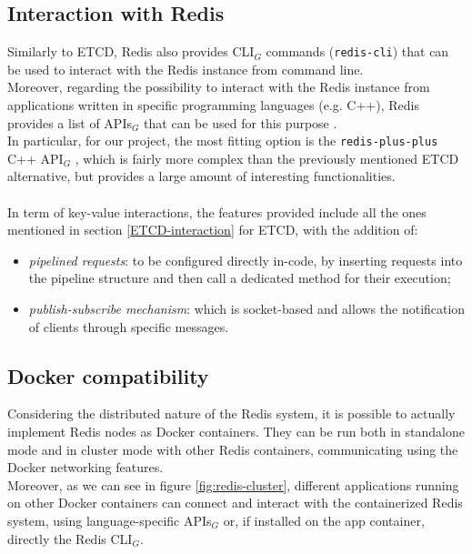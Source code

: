\subsection{Interaction with Redis}
Similarly to ETCD, Redis also provides CLI$_G$ commands (\texttt{redis-cli}) that can be used to interact with the Redis instance from command line. \\
Moreover, regarding the possibility to interact with the Redis instance from applications written in specific programming languages (e.g. C++), Redis provides a list of APIs$_G$ that can be used for this purpose \cite{site:redis-clients}. \\
In particular, for our project, the most fitting option is the \texttt{redis-plus-plus} C++ API$_G$ \cite{site:redis-plus-plus}, which is fairly more complex than the previously mentioned ETCD alternative, but provides a large amount of interesting functionalities. \\ \\
In term of key-value interactions, the features provided include all the ones mentioned in section \ref{ETCD-interaction} for ETCD, with the addition of:
\begin{itemize}
	\item \textit{pipelined requests}: to be configured directly in-code, by inserting requests into the pipeline structure and then call a dedicated method for their execution;
	\item \textit{publish-subscribe mechanism}: which is socket-based and allows the notification of clients through specific messages.
\end{itemize}

\subsection{Docker compatibility}
Considering the distributed nature of the Redis system, it is possible to actually implement Redis nodes as Docker containers. They can be run both in standalone mode and in cluster mode \cite{site:redis-docker-guide} with other Redis containers, communicating using the Docker networking features. \\
Moreover, as we can see in figure \ref{fig:redis-cluster}, different applications running on other Docker containers can connect and interact with the containerized Redis system, using language-specific APIs$_G$ or, if installed on the app container, directly the Redis CLI$_G$.



